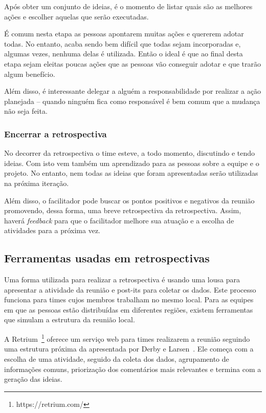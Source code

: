 Após obter um conjunto de ideias, é o momento de listar quais são as melhores ações e escolher aquelas que serão executadas.

É comum nesta etapa as pessoas apontarem muitas ações e quererem adotar todas. No entanto, acaba sendo bem difícil que todas sejam incorporadas e, algumas vezes, nenhuma delas é utilizada. Então o ideal é que ao final desta etapa sejam eleitas poucas ações que as pessoas vão conseguir adotar e que trarão algum benefício.

Além disso, é interessante delegar a alguém a responsabilidade por realizar a ação planejada -- quando ninguém fica como responsável é bem comum que a mudança não seja feita.

\subsubsection*{Encerrar a retrospectiva}

No decorrer da retrospectiva o time esteve, a todo momento, discutindo e tendo ideias. Com isto vem também um aprendizado para as pessoas sobre a equipe e o projeto. No entanto, nem todas as ideias que foram apresentadas serão utilizadas na próxima iteração.

Além disso, o facilitador pode  buscar os pontos positivos e negativos da reunião promovendo, dessa forma, uma breve retrospectiva da retrospectiva. Assim, haverá \textit{feedback} para que o facilitador melhore sua atuação e a escolha de atividades para a próxima vez.

\subsection{Ferramentas usadas em retrospectivas}

Uma forma utilizada para realizar a retrospectiva é usando uma lousa para apresentar a atividade da reunião e post-its para coletar os dados. Este processo funciona para times cujos membros trabalham no mesmo local. Para as equipes em que as pessoas estão distribuídas em diferentes regiões, existem ferramentas que simulam a estrutura da reunião local.

A Retrium~\footnote{https://retrium.com/} oferece um serviço web para times realizarem a reunião seguindo uma estrutura próxima da apresentada por Derby e Larsen~\cite{retrospectives}. Ele começa com a escolha de uma atividade, seguido da coleta dos dados, agrupamento de informações comuns, priorização dos comentários mais relevantes e termina com a geração das ideias.

